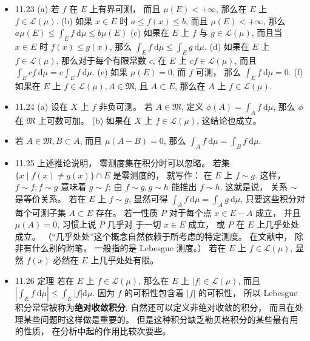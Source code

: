 \begin{itemize}
\item 11.23 (a) 若 $f$ 在 $E$ 上有界可测， 而且 $\mu(E)<+\infty$, 那么在 $E$ 上 $f \in \mathscr{L}(\mu)$. (b) 如果 $x \in E$ 时 $a \leqslant f(x) \leqslant b$, 而且 $\mu(E)<+\infty$, 那么 $a \mu(E) \leqslant \int_{E} f \mathrm{~d} \mu \leqslant b \mu(E)$ (c) 如果在 $E$ 上 $f$ 与 $g \in \mathscr{L}(\mu)$, 而且当 $x \in E$ 时 $f(x) \leqslant g(x)$, 那么 $\int_{E} f \mathrm{~d} \mu \leqslant \int_{E} g \mathrm{~d} \mu$. (d) 如果在 $E$ 上 $f \in \mathscr{L}(\mu)$, 那么对于每个有限常数 $c$, 在 $E$ 上 $c f \in \mathscr{L}(\mu)$, 而且 $\int_{E} c f \mathrm{~d} \mu=c \int_{E} f \mathrm{~d} \mu$. (e) 如果 $\mu(E)=0$, 而 $f$ 可测， 那么 $\int_{E} f \mathrm{~d} \mu=0$. (f) 如果在 $E$ 上 $f \in \mathscr{L}(\mu), A \in \mathfrak{M}$, 且 $A \subset E$, 那么在 $A$ 上 $f \in \mathscr{L}(\mu)$.

\item 11.24 (a) 设在 $X$ 上 $f$ 非负可测。 若 $A \in \mathfrak{M}$, 定义 $\phi(A)=\int_{A} f \mathrm{~d} \mu$, 那么 $\phi$ 在 $\mathfrak{M}$ 上可数可加。 (b) 如果在 $X$ 上 $f \in \mathscr{L}(\mu)$, 这结论也成立。

\item 若 $A \in \mathfrak{M}, B \subset A$, 而且 $\mu(A-B)=0$, 那么 $\int_{A} f \mathrm{~d} \mu=\int_{B} f \mathrm{~d} \mu$.

\item 11.25 上述推论说明， 零测度集在积分时可以忽略。 若集 $\{x \mid f(x) \neq g(x)\} \cap E$ 是零测度的， 就写作： 在 $E$ 上 $f \sim g$. 这样， $f \sim f ; f \sim g$ 意味着 $g \sim f$; 由 $f \sim g, g \sim h$ 能推出 $f \sim h$. 这就是说， 关系 $\sim$ 是等价关系。 若在 $E$ 上 $f \sim g$, 显然可得 $\int_{A} f \mathrm{~d} \mu=\int_{A} g \mathrm{~d} \mu$, 只要这些积分对每个可测子集 $A \subset E$ 存在。 若一性质 $P$ 对于每个点 $x \in E-A$ 成立， 并且 $\mu(A)=0$, 习惯上说 $P$ 几乎对 于一切 $x \in E$ 成立， 或 $P$ 在 $E$ 上几乎处处成立。 （“几乎处处”这个概念自然依赖于所考虑的特定测度。 在文献中， 除非有什么别的附笔， 一般指的是 Lebesgue 测度。） 若在 $E$ 上 $f \in \mathscr{L}(\mu)$, 显然 $f(x)$ 必然在 $E$ 上几乎处处有限。

\item 11.26 定理 若在 $E$ 上 $f \in \mathscr{L}(\mu)$, 那么在 $E$ 上 $|f| \in \mathscr{L}(\mu)$, 而且 $\left|\int_{E} f \mathrm{~d} \mu\right| \leqslant \int_{E}|f| \mathrm{d} \mu$. 因为 $f$ 的可积性包含着 $|f|$ 的可积性， 所以 Lebesgue 积分常常被称为\textbf{绝对收敛积分}. 自然还可以定义非绝对收敛的积分， 而且在处理某些问题时这样做是重要的。 但是这种积分缺乏勒贝格积分的某些最有用的性质， 在分析中起的作用比较次要些。


\end{itemize}
